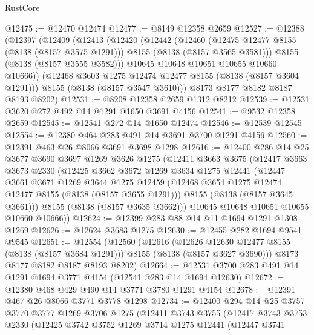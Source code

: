 \begin{lexlean}{RustCore}
\begin{coremodule}
@12475 := @12470 @12474
@12477 := @8149 @12358 @2659
@12527 := @12388
    (@12397
      (@12409
        (@12413
          (@12420
            (@12442
              (@12460
                (@12475 @12477 @8155 (@8138 (@8157 @3575 @1291)))
                @8155
                (@8138 (@8157 @3565 @3581)))
              @8155
              (@8138 (@8157 @3555 @3582)))
            @10645
            @10648
            @10651
            @10655
            @10660
            @10666))
        (@12468 @3603 @1275 @12474 @12477 @8155 (@8138 (@8157 @3604 @1291)))
        @8155
        (@8138 (@8157 @3547 @3610)))
      @8173
      @8177
      @8182
      @8187
      @8193
      @8202)
@12531 := @8208 @12358 @2659 @1312 @8212
@12539 := @12531 @3620 @272 @492 @14 @1291 @1650 @3691 @4156
@12541 := @9532 @12358 @2659
@12545 := @12541 @272 @14 @1650 @12474
@12546 := @12539 @12545
@12554 := @12380 @464 @283 @491 @14 @3691 @3700 @1291 @4156
@12560 := @12391 @463 @26 @8066 @3691 @3698 @1298
@12616 := @12400
    @286
    @14
    @25
    @3677
    @3690
    @3697
    @1269
    @3626
    @1275
    (@12411
      @3663
      @3675
      (@12417
        @3663
        @3673
        @2330
        (@12425
          @3662
          @3672
          @1269
          @3634
          @1275
          @12441
          (@12447
            @3661
            @3671
            @1269
            @3644
            @1275
            @12459
            (@12468 @3654 @1275 @12474 @12477 @8155 (@8138 (@8157 @3655 @1291)))
            @8155
            (@8138 (@8157 @3645 @3661)))
          @8155
          (@8138 (@8157 @3635 @3662)))
        @10645
        @10648
        @10651
        @10655
        @10660
        @10666))
@12624 := @12399 @283 @88 @14 @11 @1694 @1291 @1308 @1269
@12626 := @12624 @3683 @1275
@12630 := @12455 @282 @1694 @9541 @9545
@12651 := @12554
    (@12560
      (@12616
        (@12626 @12630 @12477 @8155 (@8138 (@8157 @3684 @1291)))
        @8155
        (@8138 (@8157 @3627 @3690)))
      @8173
      @8177
      @8182
      @8187
      @8193
      @8202)
@12664 := @12531 @3700 @283 @491 @14 @1291 @1694 @3771 @4154 (@12541 @283 @14 @1694 @12630)
@12672 := @12380 @468 @429 @490 @14 @3771 @3780 @1291 @4154
@12678 := @12391 @467 @26 @8066 @3771 @3778 @1298
@12734 := @12400
    @294
    @14
    @25
    @3757
    @3770
    @3777
    @1269
    @3706
    @1275
    (@12411
      @3743
      @3755
      (@12417
        @3743
        @3753
        @2330
        (@12425
          @3742
          @3752
          @1269
          @3714
          @1275
          @12441
          (@12447
            @3741

\end{coremodule}
\end{lexlean}
